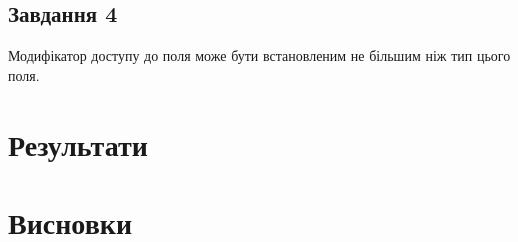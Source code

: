 \documentclass[oneside,14pt]{extarticle}
\begin{document}
\begin{normalsize}
	\subsection*{Завдання 4}
	Модифікатор доступу до поля може бути встановленим не більшим ніж тип цього поля.
		
	\section*{Результати}

	\section*{Висновки}

	    
\end{normalsize}
\end{document}
